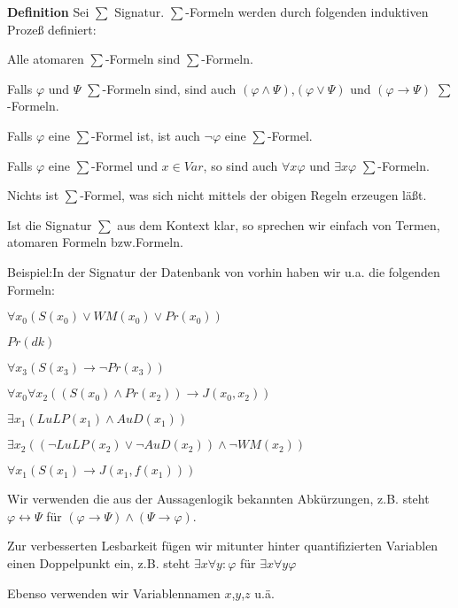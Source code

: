 \documentclass[a4paper]{article}
\renewcommand{\note}[2]{\begin{noteBox} \textbf{#1} #2 \end{noteBox}}
\begin{document}
\begin{multicols}{3}
  \note{Definition}{Sei $\sum$ Signatur. $\sum$-Formeln werden durch folgenden induktiven Prozeß definiert:
    \begin{enumerate*}
      \item Alle atomaren $\sum$-Formeln sind $\sum$-Formeln.
      \item Falls $\varphi$ und $\Psi$ $\sum$-Formeln sind, sind auch $(\varphi\wedge\Psi)$,$(\varphi\vee\Psi)$ und $(\varphi\rightarrow\Psi)$ $\sum$-Formeln.
      \item Falls $\varphi$ eine $\sum$-Formel ist, ist auch $\lnot\varphi$ eine $\sum$-Formel.
      \item Falls $\varphi$ eine $\sum$-Formel und $x\in Var$, so sind auch $\forall x\varphi$ und $\exists x\varphi$ $\sum$-Formeln.
      \item Nichts ist $\sum$-Formel, was sich nicht mittels der obigen Regeln erzeugen läßt.
    \end{enumerate*}
  }

  Ist die Signatur $\sum$ aus dem Kontext klar, so sprechen wir einfach von Termen, atomaren Formeln bzw.Formeln.

  Beispiel:In der Signatur der Datenbank von vorhin haben wir u.a. die folgenden Formeln:
  \begin{itemize*}
    \item $\forall x_0 (S(x_0)\vee WM(x_0)\vee Pr(x_0))$
    \item $Pr(dk)$
    \item $\forall x_3 (S(x_3)\rightarrow\lnot Pr(x_3))$
    \item $\forall x_0 \forall x_2 ((S(x_0)\wedge Pr(x_2))\rightarrow J(x_0,x_2))$
    \item $\exists x_1 (LuLP(x_1)\wedge AuD(x_1))$
    \item $\exists x_2 ((\lnot LuLP(x_2)\vee\lnot AuD(x_2))\wedge\lnot WM(x_2))$
    \item $\forall x_1 (S(x_1)\rightarrow J(x_1,f(x_1)))$
  \end{itemize*}

  Wir verwenden die aus der Aussagenlogik bekannten Abkürzungen, z.B. steht $\varphi\leftrightarrow\Psi$ für $(\varphi\rightarrow\Psi)\wedge(\Psi\rightarrow\varphi)$.

  Zur verbesserten Lesbarkeit fügen wir mitunter hinter quantifizierten Variablen einen Doppelpunkt ein, z.B. steht $\exists x\forall y:\varphi$ für $\exists x\forall y\varphi$

  Ebenso verwenden wir Variablennamen $x$,$y$,$z$ u.ä.


\end{multicols}
\end{document}
